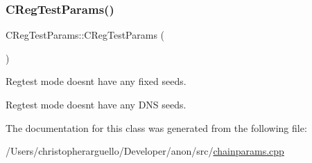 \subsubsection{\texorpdfstring{C\+Reg\+Test\+Params()}{CRegTestParams()}}
{\footnotesize\ttfamily C\+Reg\+Test\+Params\+::\+C\+Reg\+Test\+Params (\begin{DoxyParamCaption}{ }\end{DoxyParamCaption})\hspace{0.3cm}{\ttfamily [inline]}}

Regtest mode doesn\textquotesingle{}t have any fixed seeds.

Regtest mode doesn\textquotesingle{}t have any D\+NS seeds. 

The documentation for this class was generated from the following file\+:\begin{DoxyCompactItemize}
\item 
/\+Users/christopherarguello/\+Developer/anon/src/\mbox{\hyperlink{chainparams_8cpp}{chainparams.\+cpp}}\end{DoxyCompactItemize}
